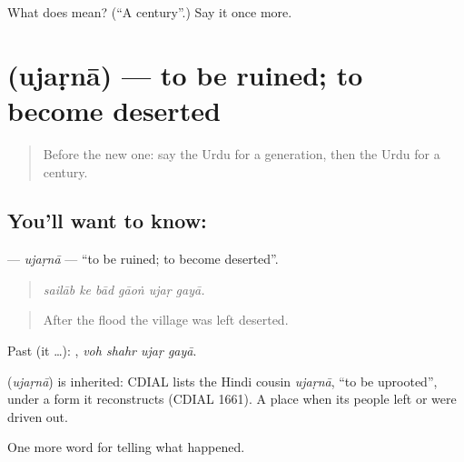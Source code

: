 \begin{tcolorbox}[breakable,colback=teal!4,colframe=teal!35!black,title={Before you move on}]
What does  mean? (\textquotedblleft{}A century\textquotedblright{}.) Say it once more.
\end{tcolorbox}
\section[\texorpdfstring{\ur{اجڑنا} (ujaṛnā)}{اجڑنا (ujaṛnā)}]{ (ujaṛnā) — to be ruined; to become deserted}

\label{lesson:UR-C315-ujarna}



\begin{quote}
Before the new one: say the Urdu for a generation, then the Urdu for a century.
\end{quote}

\subsection*{You'll want to know: }
\textbf{} — \emph{ujaṛnā} — \textquotedblleft{}to be ruined; to become deserted\textquotedblright{}.

\begin{quote}
     
\end{quote}

\begin{quote}
\emph{sailāb ke bād gāoṅ ujaṛ gayā.}
\end{quote}

\begin{quote}
After the flood the village was left deserted.
\end{quote}

Past (it …):    , \emph{voh shahr ujaṛ gayā}.

\begin{cousinweb}
\textbf{} (\emph{ujaṛnā}) is inherited: CDIAL lists the Hindi cousin \emph{ujaṛnā}, \textquotedblleft{}to be uprooted\textquotedblright{}, under a form it reconstructs (CDIAL 1661). A place \textbf{ } when its people left or were driven out.
\end{cousinweb}

\begin{grammarlens}[title={What you've built}]
One more word for telling what happened.
\end{grammarlens}

